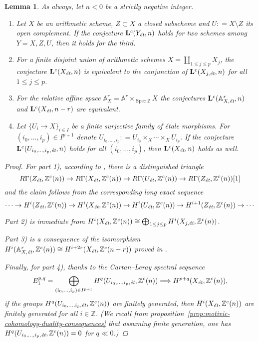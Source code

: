 \documentclass[leqno,12pt]{article}
\theoremstyle{plain}
\newtheorem{lemma}[theorem]{\indent\sc Lemma}
\theoremstyle{definition}
\DeclareMathOperator{\Spec}{Spec}
\newcommand{\ZZ}{\mathbb{Z}}
\renewcommand{\AA}{\mathbb{A}}
\newcommand{\dfn}{\mathrel{\mathop:}=}
\newcommand{\et}{\text{\it \'{e}t}}
\begin{document}
\begin{lemma}
  \label{lemma:Lc(Xet)-operations}
  As always, let $n < 0$ be a strictly negative integer.

  \begin{enumerate}
  \item[$1)$] Let $X$ be an arithmetic scheme, $Z \subset X$ a closed subscheme
    and $U \dfn X\setminus Z$ its open complement. If the conjecture
    $\mathbf{L}^c (Y_\et,n)$ holds for two schemes among $Y = X,Z,U$, then it
    holds for the third.

  \item[$2)$] For a finite disjoint union of arithmetic schemes
    $X = \coprod_{1 \le j \le p} X_j$, the conjecture $\mathbf{L}^c (X_\et,n)$
    is equivalent to the conjunction of $\mathbf{L}^c (X_{j,\et},n)$ for all
    $1 \le j \le p$.

  \item[$3)$] For the relative affine space $\AA^r_X = \AA^r \times_{\Spec \ZZ} X$
    the conjectures $\mathbf{L}^c (\AA^r_{X,\et},n)$ and
    $\mathbf{L}^c (X_\et,n-r)$ are equivalent.

  \item[$4)$] Let $\{ U_i \to X \}_{i \in I}$ be a finite surjective family of
    \'{e}tale morphisms. For $(i_0,\ldots,i_p) \in I^{p+1}$ denote
    $U_{i_0,\ldots,i_p} \dfn U_{i_0} \times_X \cdots \times_X U_{i_p}$.
    If the conjecture $\mathbf{L}^c (U_{i_0,\ldots,i_p, \et},n)$ holds for all
    $(i_0,\ldots,i_p)$, then $\mathbf{L}^c (X_\et,n)$ holds as well.
  \end{enumerate}

  \begin{proof}
    For part 1), according to \cite[Corollary~7.2]{Geisser-2010}, there is a
    distinguished triangle
    \[ R\Gamma (Z_\et, \ZZ^c (n)) \to
       R\Gamma (X_\et, \ZZ^c (n)) \to
       R\Gamma (U_\et, \ZZ^c (n)) \to
       R\Gamma (Z_\et, \ZZ^c (n)) [1] \]
    and the claim follows from the corresponding long exact sequence
    \[ \cdots \to H^i (Z_\et, \ZZ^c (n)) \to
       H^i (X_\et, \ZZ^c (n)) \to
       H^i (U_\et, \ZZ^c (n)) \to
       H^{i+1} (Z_\et, \ZZ^c (n)) \to \cdots \]

    Part 2) is immediate from
    $H^i (X_\et, \ZZ^c (n)) \cong \bigoplus_{1 \le j \le p} H^i (X_{j,\et}, \ZZ^c (n))$.

    Part 3) is a consequence of the isomorphism
    $H^i (\AA^r_{X,\et}, \ZZ^c (n)) \cong H^{i+2r} (X_\et, \ZZ^c (n-r))$
    proved in \cite[Lemma~5.11]{Morin-2014}.

    Finally, for part 4), thanks to the Cartan--Leray spectral sequence
    \[ E_1^{p,q} = \bigoplus_{(i_0,\ldots,i_p) \in I^{p+1}} H^q (U_{i_0,\ldots,i_p, \et}, \ZZ^c (n))
      \Longrightarrow H^{p+q} (X_\et, \ZZ^c (n)), \]
    if the groups $H^q (U_{i_0,\ldots,i_p, \et}, \ZZ^c (n))$ are finitely
    generated, then $H^i (X_\et, \ZZ^c (n))$ are finitely generated for all
    $i\in \ZZ$.
    (We recall from
    proposition~\ref{prop:motivic-cohomology-duality-consequences} that assuming
    finite generation, one has $H^q (U_{i_0,\ldots,i_p, \et}, \ZZ^c (n)) = 0$
    for $q \ll 0$.)
  \end{proof}
\end{lemma}
\end{document}
